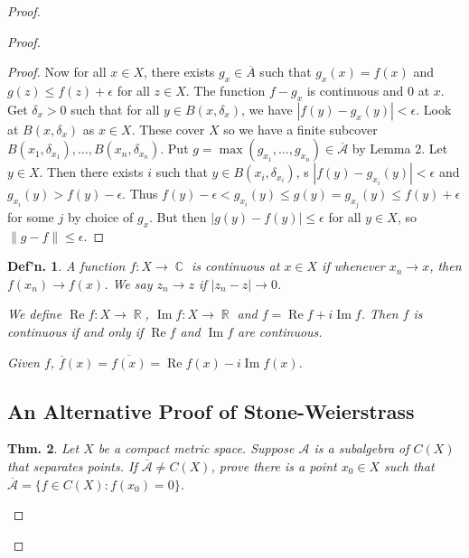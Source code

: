 \documentclass[12pt, a4paper]{book}
\DeclareMathOperator{\R}{\mathbb{R}}
\DeclareMathOperator{\C}{\mathbb{C}}
\DeclareMathOperator{\Re}{Re}
\DeclareMathOperator{\Im}{Im}
\newcommand{\norm}[1]{\left\lVert#1\right\rVert} %
\newtheorem{theorem}{Thm.}[section]
\newtheorem{definition}[theorem]{Def'n.}
\theoremstyle{nonumberplain}
\newtheorem{proof}{Proof}
\begin{document}
\begin{proof}
\begin{proof}
\begin{proof}
    Now for all $x\in X$, there exists $g_x\in\overline{A}$ such that $g_x(x)=f(x)$ and $g(z)\leq f(z)+\epsilon$ for all $z\in X$.
    The function $f-g_x$ is continuous and $0$ at $x$.
    Get $\delta_x>0$ such that for all $y\in B(x,\delta_x)$, we have $|f(y)-g_x(y)|<\epsilon$.
    Look at $B(x,\delta_x)$ as $x\in X$.
    These cover $X$ so we have a finite subcover $B(x_1,\delta_{x_1}),\ldots,B(x_n,\delta_{x_n})$.
    Put $g=\max(g_{x_1},\ldots,g_{x_n})\in\overline{\mathcal{A}}$ by Lemma 2.
    Let $y\in X$.
    Then there exists $i$ such that $y\in B(x_i,\delta_{x_i})$, s $|f(y)-g_{x_i}(y)|<\epsilon$ and $g_{x_i}(y)>f(y)-\epsilon$.
    Thus $f(y)-\epsilon<g_{x_i}(y)\leq g(y)=g_{x_j}(y)\leq f(y)+\epsilon$ for some $j$ by choice of $g_x$.
    But then $|g(y)-f(y)|\leq\epsilon$ for all $y\in X$, so $\norm{g-f}\leq\epsilon$.
\end{proof}
\begin{definition}
    A function $f:X\to\C$ is continuous at $x\in X$ if whenever $x_n\to x$, then $f(x_n)\to f(x)$.
    We say $z_n\to z$ if $|z_n-z|\to 0$.

    We define $\Re f:X\to\R$, $\Im f:X\to\R$ and $f=\Re f+i\Im f$.
    Then $f$ is continuous if and only if $\Re f$ and $\Im f$ are continuous.

    Given $f$, $\overline{f}(x)=\overline{f(x)}=\Re f(x)-i\Im f(x)$.
\end{definition}
\subsection{An Alternative Proof of Stone-Weierstrass}
\begin{theorem}
    Let $X$ be a compact metric space.
    Suppose $\mathcal{A}$ is a subalgebra of $C(X)$ that separates points.
    If $\overline{\mathcal{A}}\neq C(X)$, prove there is a point $x_0\in X$ such that $\overline{\mathcal{A}}=\{f\in C(X):f(x_0)=0\}$.
\end{theorem}


\end{proof}
\end{proof}
\end{document}
